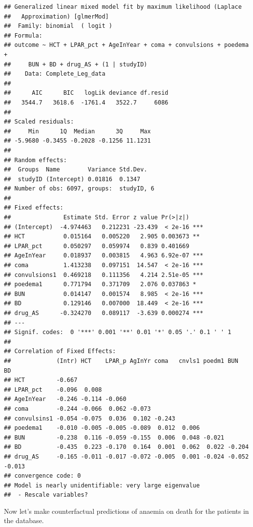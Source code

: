 \documentclass[]{article}
\begin{document}
\begin{verbatim}
## Generalized linear mixed model fit by maximum likelihood (Laplace
##   Approximation) [glmerMod]
##  Family: binomial  ( logit )
## Formula: 
## outcome ~ HCT + LPAR_pct + AgeInYear + coma + convulsions + poedema +  
##     BUN + BD + drug_AS + (1 | studyID)
##    Data: Complete_Leg_data
## 
##      AIC      BIC   logLik deviance df.resid 
##   3544.7   3618.6  -1761.4   3522.7     6086 
## 
## Scaled residuals: 
##     Min      1Q  Median      3Q     Max 
## -5.9680 -0.3455 -0.2028 -0.1256 11.1231 
## 
## Random effects:
##  Groups  Name        Variance Std.Dev.
##  studyID (Intercept) 0.01816  0.1347  
## Number of obs: 6097, groups:  studyID, 6
## 
## Fixed effects:
##               Estimate Std. Error z value Pr(>|z|)    
## (Intercept)  -4.974463   0.212231 -23.439  < 2e-16 ***
## HCT           0.015164   0.005220   2.905 0.003673 ** 
## LPAR_pct      0.050297   0.059974   0.839 0.401669    
## AgeInYear     0.018937   0.003815   4.963 6.92e-07 ***
## coma          1.413238   0.097151  14.547  < 2e-16 ***
## convulsions1  0.469218   0.111356   4.214 2.51e-05 ***
## poedema1      0.771794   0.371709   2.076 0.037863 *  
## BUN           0.014147   0.001574   8.985  < 2e-16 ***
## BD            0.129146   0.007000  18.449  < 2e-16 ***
## drug_AS      -0.324270   0.089117  -3.639 0.000274 ***
## ---
## Signif. codes:  0 '***' 0.001 '**' 0.01 '*' 0.05 '.' 0.1 ' ' 1
## 
## Correlation of Fixed Effects:
##             (Intr) HCT    LPAR_p AgInYr coma   cnvls1 poedm1 BUN    BD    
## HCT         -0.667                                                        
## LPAR_pct    -0.096  0.008                                                 
## AgeInYear   -0.246 -0.114 -0.060                                          
## coma        -0.244 -0.066  0.062 -0.073                                   
## convulsins1 -0.054 -0.075  0.036  0.102 -0.243                            
## poedema1    -0.010 -0.005 -0.005 -0.089  0.012  0.006                     
## BUN         -0.238  0.116 -0.059 -0.155  0.006  0.048 -0.021              
## BD          -0.435  0.223 -0.170  0.164  0.001  0.062  0.022 -0.204       
## drug_AS     -0.165 -0.011 -0.017 -0.072 -0.005  0.001 -0.024 -0.052 -0.013
## convergence code: 0
## Model is nearly unidentifiable: very large eigenvalue
##  - Rescale variables?
\end{verbatim}

Now let's make counterfactual predictions of anaemia on death for the
patients in the database.
\end{document}
